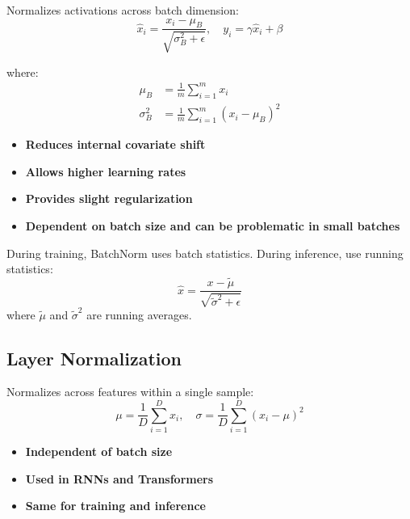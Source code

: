 Normalizes activations across batch dimension:
\begin{equation}
\hat{x}_i = \frac{x_i - \mu_B}{\sqrt{\sigma_B^2 + \epsilon}}, \quad y_i = \gamma \hat{x}_i + \beta
\end{equation}

where:
\begin{align}
\mu_B &= \frac{1}{m}\sum_{i=1}^{m} x_i \\
\sigma_B^2 &= \frac{1}{m}\sum_{i=1}^{m}(x_i - \mu_B)^2
\end{align}

\begin{properties}
\begin{itemize}
    \item \textbf{Reduces internal covariate shift}
    \item \textbf{Allows higher learning rates}
    \item \textbf{Provides slight regularization}
    \item \textbf{Dependent on batch size and can be problematic in small batches}
\end{itemize}
\end{properties}

\begin{note}
During training, BatchNorm uses batch statistics. During inference, use running statistics:
\begin{equation}
\hat{x} = \frac{x - \tilde{\mu}}{\sqrt{\tilde{\sigma}^2 + \epsilon}}
\end{equation}
where $\tilde{\mu}$ and $\tilde{\sigma}^2$ are running averages.
\end{note}

\subsection{Layer Normalization}

Normalizes across features within a single sample:
\begin{equation}
\mu = \frac{1}{D}\sum_{i=1}^{D} x_i, \quad \sigma = \frac{1}{D}\sum_{i=1}^{D}(x_i - \mu)^2
\end{equation}

\begin{itemize}
    \item \textbf{Independent of batch size}
    \item \textbf{Used in RNNs and Transformers}
    \item \textbf{Same for training and inference}
\end{itemize}

